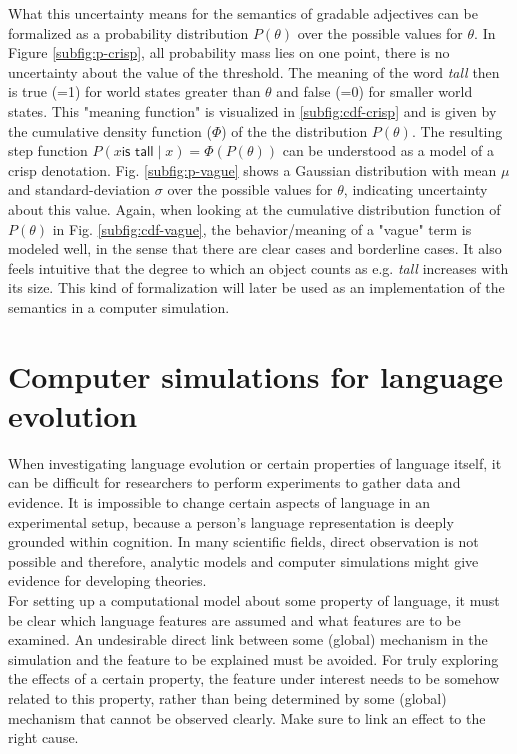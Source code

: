 What this uncertainty means for the semantics of gradable adjectives can be formalized as a probability distribution $P(\theta)$ over the possible values for $\theta$. In Figure \ref{subfig:p-crisp}, all probability mass lies on one point, there is no uncertainty about the value of the threshold. The meaning of the word \textit{tall} then is true (=1) for world states greater than $\theta$ and false (=0) for smaller world states. This "meaning function" is visualized in \ref{subfig:cdf-crisp} and is given by the cumulative density function ($\Phi$) of the the distribution $P(\theta)$. The resulting step function $P(x \textsf{is tall} \mid x) = \Phi(P(\theta))$ can be understood as a model of a crisp denotation. Fig. \ref{subfig:p-vague} shows a Gaussian distribution with mean $\mu$ and standard-deviation $\sigma$ over the possible values for $\theta$, indicating uncertainty about this value. Again, when looking at the cumulative distribution function of $P(\theta)$ in Fig. \ref{subfig:cdf-vague}, the behavior/meaning of a "vague" term is modeled well, in the sense that there are clear cases and borderline cases. It also feels intuitive that the degree to which an object counts as e.g. \textit{tall} increases with its size. This kind of formalization will later be used as an implementation of the semantics in a computer simulation.

\section{Computer simulations for language evolution}
When investigating language evolution or certain properties of language itself, it can be difficult for researchers to perform experiments to  gather data and evidence. It is impossible to change certain aspects of language in an experimental setup, because a person's language representation is deeply grounded within cognition. In many scientific fields, direct observation is not possible and therefore, analytic models and computer simulations might give evidence for developing theories.\\

For setting up a computational model about some property of language, it must be clear which language features are assumed and what features are to be examined. An undesirable direct link between some (global) mechanism in the simulation and the feature to be explained must be avoided. For truly exploring the effects of a certain property, the feature under interest needs to be somehow related to this property, rather than being determined by some (global) mechanism that cannot be observed clearly. Make sure to link an effect to the right cause.\\

